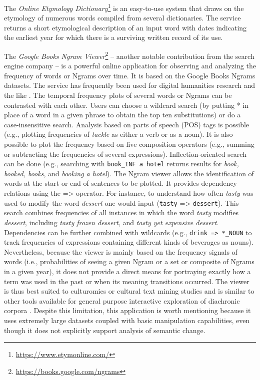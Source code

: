 \documentclass[output=paper%
]{langsci/langscibook}
\begin{document}
The \emph{Online Etymology Dictionary}\footnote{\url{https://www.etymonline.com/}} is an easy-to-use system that draws on the etymology of numerous words compiled from several dictionaries. The service returns a short etymological description of an input word with dates indicating the earliest year for which there is a surviving written record of its use. 

The \emph{Google Books Ngram Viewer}\footnote{\url{https://books.google.com/ngrams}} \cite{michel2011quantitative} -- another notable contribution from the search engine company -- is a powerful online application for observing and analyzing the frequency of words or Ngrams over time. It is based on the Google Books Ngrams datasets. The service has frequently been used for digital humanities research and the like \citep[e.g.][]{michel2011quantitative,acerbi-etal-2013,bentley-etal-2014,pechenick-etal-2015,iliev-etal-2016}. The temporal frequency plots of several words or Ngrams can be contrasted with each other. Users can choose a wildcard search (by putting * in place of a word in a given phrase to obtain the top ten substitutions) or do a case-insensitive search. Analysis based on parts of speech (POS) tags is possible (e.g., plotting frequencies of \emph{tackle} as either a verb or as a noun). It is also possible to plot the frequency based on five composition operators (e.g., summing or subtracting the frequencies of several expressions). Inflection-oriented search can be done (e.g., searching with \texttt{\mbox{book\_INF} a hotel} returns results for \emph{book, booked, books}, and \emph{booking a hotel}). The Ngram viewer allows the identification of words at the start or end of sentences to be plotted. 
It provides dependency relations using the => operator. For instance, to understand how often \emph{tasty} was used to modify the word \emph{dessert} one would input (\texttt{tasty} => \texttt{dessert}). This search combines frequencies of all instances in which the word \emph{tasty} modifies \emph{dessert}, including \emph{tasty frozen dessert}, and \emph{tasty yet expensive dessert}. Dependencies can be further combined with wildcards (e.g., \texttt{drink => *\_NOUN} to track frequencies of expressions containing different kinds of beverages as nouns). 
Nevertheless, because the viewer is mainly based on the frequency signals of words (i.e., probabilities of seeing a given Ngram or a set or composite of Ngrams in a given year), it does not provide a direct means for portraying exactly how a term was used in the past or when its meaning transitions occurred. The viewer is thus best suited to culturomics or cultural text mining studies and is similar to other tools available for general purpose interactive exploration of diachronic corpora \citep[e.g.][]{michel2011quantitative,odijk2012time,eijnatten2014using,jatowt2016historycomparator}. Despite this limitation, this application is worth mentioning because it uses extremely large datasets coupled with basic manipulation capabilities,  even though it does not explicitly support  analysis of semantic change.
\end{document}
